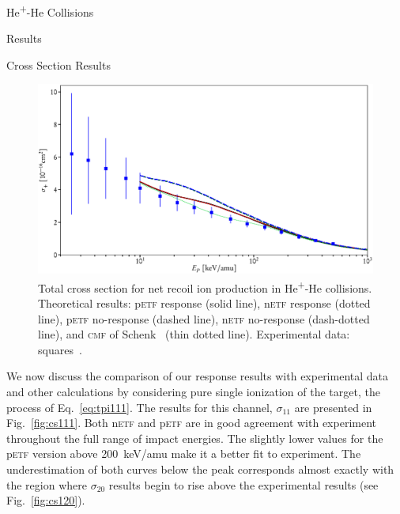 \documentclass[a5paper, 9 pt]{extreport}
\begin{document}
\begin{chapter}{\texorpdfstring{He\textsuperscript{+}}{He+}-He Collisions \label{chap:hephe}}
\begin{section}{Results \label{sec:hephe-disc}}
\begin{subsection}{Cross Section Results \label{sec:hephe-res}}
         \begin{figure}[t]
            \centering
            \includegraphics[width = \linewidth]{./images/hephe-cross/netRecoil.eps}
            \caption[Total cross section for net recoil ion production in He\textsuperscript{+}-He
                     collisions.]
                    {Total cross section for net recoil ion production in He\textsuperscript{+}-He
                     collisions.
                     Theoretical results: p\textsc{etf} response (solid line), n\textsc{etf} response
                                          (dotted line), p\textsc{etf} no-response (dashed line),
                                          n\textsc{etf} no-response (dash-dotted line), and
                                          \textsc{cmf} of Schenk~\cite{geraldDiss}
                                          (thin dotted line).
                     Experimental data: squares~\cite{RGID85}. \label{fig:recoil}}
         \end{figure}

         We now discuss the comparison of our response results with experimental data and other
         calculations by considering pure single ionization of the target, the process of
         Eq.~\eqref{eq:tpi111}. The results for this channel, $\sigma_{11}$ are presented in
         Fig.~\ref{fig:cs111}. Both n\textsc{etf} and p\textsc{etf} are in good agreement with
         experiment throughout the full range of impact energies. The slightly lower values for the
         p\textsc{etf} version above 200~keV/amu make it a better fit to experiment. The underestimation
         of both curves below the peak corresponds almost exactly with the region where $\sigma_{20}$
         results begin to rise above the experimental results (see Fig.~\ref{fig:cs120}).


\end{subsection}
\end{section}
\end{chapter}
\end{document}

